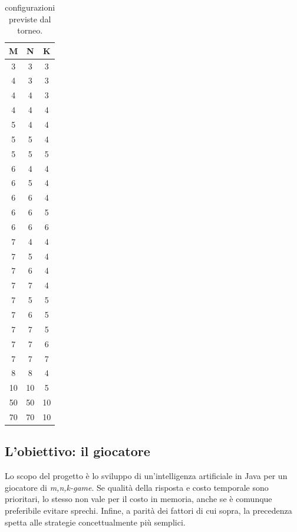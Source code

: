 \documentclass{article}
\begin{document}
\begin{table}[h!]
\centering
\begin{tabular}{ | c | c | c | }
  \hline
  M & N & K \\
  \hline
  3 & 3 & 3 \\
  \hline
  4 & 3 & 3 \\
  \hline
  4 & 4 & 3 \\
  \hline
  4 & 4 & 4 \\
  \hline
  5 & 4 & 4 \\
  \hline
  5 & 5 & 4 \\
  \hline
  5 & 5 & 5 \\
  \hline
  6 & 4 & 4 \\
  \hline
  6 & 5 & 4 \\
  \hline
  6 & 6 & 4 \\
  \hline
  6 & 6 & 5 \\
  \hline
  6 & 6 & 6 \\
  \hline
  7 & 4 & 4 \\
  \hline
  7 & 5 & 4 \\
  \hline
  7 & 6 & 4 \\
  \hline
  7 & 7 & 4 \\
  \hline
  7 & 5 & 5 \\
  \hline
  7 & 6 & 5 \\
  \hline
  7 & 7 & 5 \\
  \hline
  7 & 7 & 6 \\
  \hline
  7 & 7 & 7 \\
  \hline
  8 & 8 & 4 \\
  \hline
  10 & 10 & 5 \\
  \hline
  50 & 50 & 10 \\
  \hline
  70 & 70 & 10 \\
  \hline
\end{tabular}
  \caption{configurazioni previste dal torneo.}
  \label{table:1}
\end{table}

\subsection{L'obiettivo: il giocatore}

Lo scopo del progetto è lo sviluppo di un'intelligenza artificiale in Java per
un giocatore di \emph{m,n,k-game}. Se qualità della risposta e costo temporale
sono prioritari, lo stesso non vale per il costo in memoria, anche se è
comunque preferibile evitare sprechi. Infine, a parità dei fattori di cui sopra,
la precedenza spetta alle strategie concettualmente più semplici.
\end{document}
